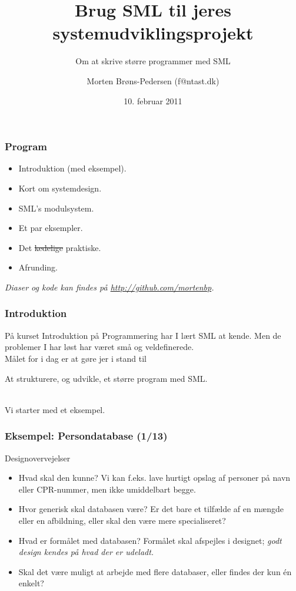 \documentclass[slidestop,compress,mathserif, xcolor=table]{beamer}
\title[]{Brug SML til jeres systemudviklingsprojekt}
\subtitle{Om at skrive større programmer med SML}
\author[Morten Brøns-Pedersen]
       {Morten Brøns-Pedersen {\tiny(f@ntast.dk)}}
\institute[DIKU]{Datalogisk institut}
\date[]{10. februar 2011}
\begin{document}
\frame[plain]{\titlepage}

\begin{frame}
  \frametitle{Program}

  \begin{itemize}
  \item Introduktion (med eksempel).
  \item Kort om systemdesign.
  \item SML's modulsystem.
  \item Et par eksempler.
  \item Det \sout{kedelige} praktiske.
  \item Afrunding.
  \end{itemize}\vfill

  \textit{Diaser og kode kan findes på \url{http://github.com/mortenbp}.}
\end{frame}

\begin{frame}
  \frametitle{Introduktion}

  På kurset Introduktion på Programmering har I lært SML at kende. Men de
  problemer I har løst har været små og veldefinerede.\\[1em]

  Målet for i dag er at gøre jer i stand til
  \begin{block}{}
    \center At strukturere, og udvikle, et større program med SML.
  \end{block}\ \\

  Vi starter med et eksempel.
\end{frame}

\begin{frame}
  \frametitle{Eksempel: Persondatabase \quad (1/13)}

  Designovervejelser
  \begin{itemize}
  \item Hvad skal den kunne? Vi kan f.eks. lave hurtigt opslag af personer på
    navn eller CPR-nummer, men ikke umiddelbart begge.
  \item Hvor generisk skal databasen være? Er det bare et tilfælde af en mængde
    eller en afbildning, eller skal den være mere specialiseret?
  \item Hvad er formålet med databasen? Formålet skal afspejles i designet; \textit{godt
      design kendes på hvad der er udeladt.}
  \item Skal det være muligt at arbejde med flere databaser, eller findes der
    kun én enkelt?
  \end{itemize}
\end{frame}
\end{document}
